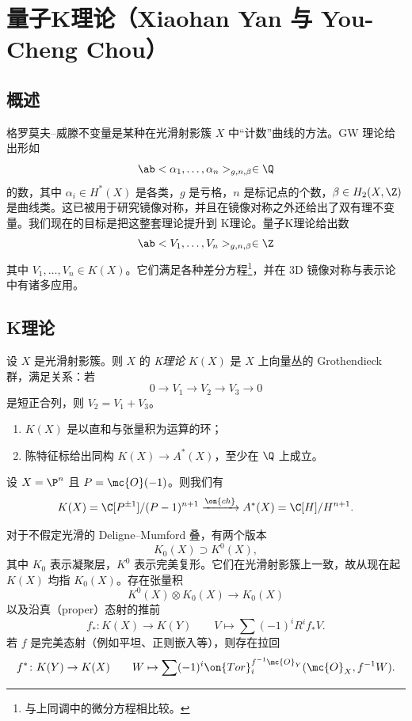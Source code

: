 \section{量子K理论（Xiaohan Yan 与 You-Cheng Chou）}%
\label{sec:Quantum K-theory (Xiaohan Yan and You-Cheng Chou)}

\subsection{概述}%
\label{sub:Overview}

格罗莫夫--威滕不变量是某种在光滑射影簇 \(X\) 中“计数”曲线的方法。GW 理论给出形如
\[ \ab<\alpha_1, \ldots, \alpha_n>_{g, n, \beta} \in \Q \]
的数，其中 \(\alpha_i \in H^*(X)\) 是各类，\(g\) 是亏格，\(n\) 是标记点的个数，\(\beta \in H_2(X, \Z)\) 是曲线类。这已被用于研究镜像对称，并且在镜像对称之外还给出了双有理不变量。我们现在的目标是把这整套理论提升到 K理论。量子K理论给出数
\[ \ab<V_1, \ldots, V_n>_{g, n, \beta} \in \Z \]
其中 \(V_1, \ldots, V_n \in K(X)\)。它们满足各种差分方程\footnote{与上同调中的微分方程相比较。}，并在 3D 镜像对称与表示论中有诸多应用。

\subsection{K理论}%
\label{sub:K-theory}

\begin{defn}
    设 \(X\) 是光滑射影簇。则 \(X\) 的 \textit{K理论} \(K(X)\) 是 \(X\) 上向量丛的 Grothendieck 群，满足关系：若
    \[ 0 \to V_1 \to V_2 \to V_3 \to 0 \]
    是短正合列，则 \(V_2 = V_1 + V_3\)。
\end{defn}

\begin{rmk}\leavevmode
    \begin{enumerate}
        \item \(K(X)\) 是以直和与张量积为运算的环；
        \item 陈特征标给出同构 \(K(X) \to A^*(X)\)，至少在 \(\Q\) 上成立。
    \end{enumerate}
\end{rmk}

\begin{exm}
    设 \(X = \P^n\) 且 \(P = \mc{O}(-1)\)。则我们有
    \[ K(X) = \C[P^{\pm 1}]/(P-1)^{n+1} \xrightarrow{\on{ch}} A^*(X) = \C[H]/H^{n+1}. \]
\end{exm}

对于不假定光滑的 Deligne--Mumford 叠，有两个版本
\[ K_0(X) \supset K^0(X), \]
其中 \(K_0\) 表示凝聚层，\(K^0\) 表示完美复形。它们在光滑射影簇上一致，故从现在起 \(K(X)\) 均指 \(K_0(X)\)。存在张量积
\[ K^0(X) \otimes K_0(X) \to K_0(X) \]
以及沿真（proper）态射的推前
\[ f_* \colon K(X) \to K(Y) \qquad V \mapsto \sum (-1)^i R^i f_* V. \]
若 \(f\) 是完美态射（例如平坦、正则嵌入等），则存在拉回
\[ f^* \colon K(Y) \to K(X) \qquad W \mapsto \sum (-1)^i \on{Tor}_i^{f^{-1} \mc{O}_Y} (\mc{O}_X, f^{-1} W). \]

